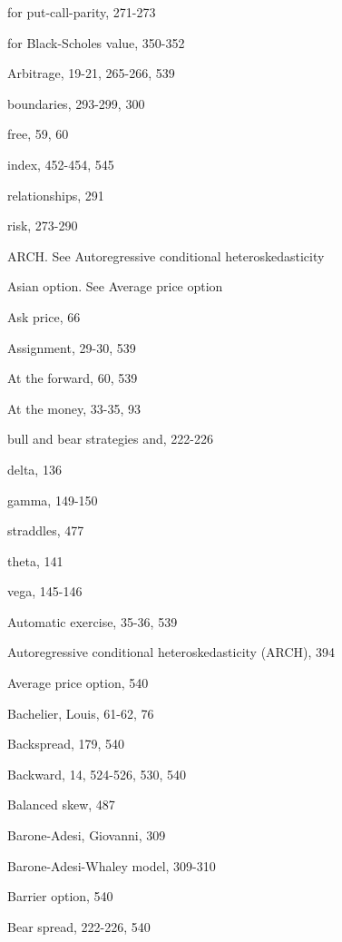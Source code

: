 \noindent for put-call-parity, 271-273\par
\noindent for Black-Scholes value, 350-352\par
\noindent Arbitrage, 19-21, 265-266, 539\par
\noindent boundaries, 293-299, 300\par
\noindent free, 59, 60\par
\noindent index, 452-454, 545\par
\noindent relationships, 291\par
\noindent risk, 273-290\par
ARCH. See Autoregressive conditional heteroskedasticity\par
\noindent Asian option. See Average price option\par
\noindent Ask price, 66\par
\noindent Assignment, 29-30, 539\par
\noindent At the forward, 60, 539\par
\noindent At the money, 33-35, 93\par
\noindent bull and bear strategies and, 222-226\par
\noindent delta, 136\par
\noindent gamma, 149-150\par
\noindent straddles, 477\par
\noindent theta, 141\par
\noindent vega, 145-146\par
\noindent Automatic exercise, 35-36, 539\par
Autoregressive conditional heteroskedasticity (ARCH), 394\par
\noindent Average price option, 540\par
\noindent Bachelier, Louis, 61-62, 76\par
\noindent Backspread, 179, 540\par
\noindent Backward, 14, 524-526, 530, 540\par
\noindent Balanced skew, 487\par
\noindent Barone-Adesi, Giovanni, 309\par
\noindent Barone-Adesi-Whaley model, 309-310\par
\noindent Barrier option, 540\par
\noindent Bear spread, 222-226, 540\par

